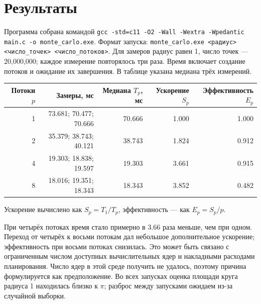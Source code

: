 \documentclass[unicode, 12pt, a4paper, oneside, fleqn]{article}
\begin{document}
\section{Результаты}
Программа собрана командой \texttt{gcc -std=c11 -O2 -Wall -Wextra -Wpedantic main.c -o monte\_carlo.exe}. Формат запуска: \texttt{monte\_carlo.exe <радиус> <число\_точек> <число\_потоков>}. Для замеров радиус равен 1, число точек — 20,000,000; каждое измерение повторялось три раза. Время включает создание потоков и ожидание их завершения. В таблице указана медиана трёх измерений.

\begin{center}
\begin{tabular}{r r r r r}
\hline
Потоки $p$ & Замеры, мс & Медиана $T_p$, мс & Ускорение $S_p$ & Эффективность $E_p$ \\
\hline
1 & 73.681; 70.477; 70.666 & 70.666 & 1.000 & 1.000 \\
2 & 35.379; 38.743; 40.121 & 38.743 & 1.824 & 0.912 \\
4 & 19.303; 18.838; 19.597 & 19.303 & 3.661 & 0.915 \\
8 & 18.016; 19.351; 18.343 & 18.343 & 3.852 & 0.482 \\
\hline
\end{tabular}
\end{center}

Ускорение вычислено как $S_p=T_1/T_p$, эффективность — как $E_p=S_p/p$.

\begin{center}
\end{center}

При четырёх потоках время стало примерно в 3.66 раза меньше, чем при одном. Переход от четырёх к восьми потокам дал небольшое дополнительное ускорение; эффективность при восьми потоках снизилась. Это может быть связано с ограниченным числом доступных вычислительных ядер и накладными расходами планирования. Число ядер в этой среде получить не удалось, поэтому причина формулируется как предположение. Во всех запусках оценка площади круга радиуса 1 находилась близко к $\pi$; разброс между запусками ожидаем из-за случайной выборки.
\end{document}
